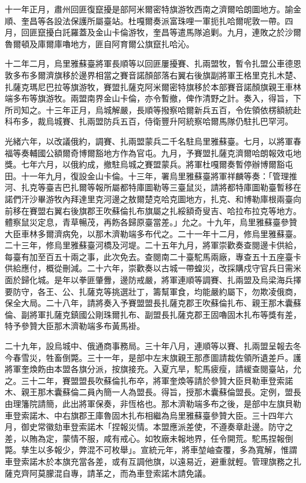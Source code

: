 \begin{pinyinscope}
十一年正月，肅州回匪復竄擾是部阿米爾密特旗游牧西南之濟爾哈朗圖地方。諭金順、奎昌等各設法保護所屬臺站。杜嘎爾奏派富珠哩一軍扼扎哈爾呢敦一帶。四月，回匪竄擾白託羅蓋及金山卡倫游牧，奎昌等遣馬隊追剿。九月，連敗之於沙爾魯爾頓及庫爾庫嚕地方，匪自阿育爾公旗竄扎哈沁。

十二年二月，烏里雅蘇臺將軍長順等以回匪屢擾賽、扎兩盟牧，暫令扎盟公車德恩敦多布多爾濟旗移於邊界相當之賽音諾顏部落右翼右後旗副將軍王格里克扎木楚、扎薩克瑪尼巴拉等旗游牧，賽盟扎薩克阿米爾密特旗移於本部賽音諾顏旗親王車林端多布等旗游牧。兩盟南界金山卡倫，亦令暫撤，俾作清野之計。奏入，得旨，下所司知之。十三年正月，烏城解嚴，長順等撥察哈爾新兵五百，令佐領依楞額統赴科布多，裁烏城賽、扎兩盟防兵五百，侍衛豐升阿統察哈爾馬隊仍駐扎巴罕河。

光緒六年，以改議俄約，調賽、扎兩盟蒙兵二千名駐烏里雅蘇臺。七月，以將軍春福等奏輔國公額爾奇博爾豁地方作為官屯。九月，予賽盟扎薩克濟爾哈朗報效屯地獎。七年六月，以俄約成，撤駐烏城之賽盟蒙兵。將軍杜嘎爾奏暫停辦博爾豁屯田。十一年九月，復設金山卡倫。十三年，署烏里雅蘇臺將軍祥麟等奏：「管理推河、扎克等臺吉巴扎爾等報所屬都特庫圖勒等三臺鼠災，請將都特庫圖勒臺暫移在諾們汗沙畢游牧內拜達里克河邊之敖爾楚克哈克圖地方，扎克、和博勒庫根兩臺向前移在賽盟右翼右後旗郡王吹蘇倫扎布旗屬之扎綏額奇叟吉、哈拉布拉克等地方。體察鼠災定息，青草暢茂，再飭各歸原臺當差。」允之。十九年，烏里雅蘇臺參贊大臣車林多爾濟病免，以那木濟勒端多布代之。二十一年十二月，修烏里雅蘇臺。二十三年，修烏里雅蘇臺河橋及河堤。二十五年九月，將軍崇歡奏查閱邊卡供給，每臺有加至百五十兩之事，此次免去。查閱南二十臺駝馬兩廠，專查五十五座臺卡供給應付，概從刪減。二十六年，崇歡奏以古城一帶蝗災，改採購戍守官兵日需米面於歸化城。是年以拳匪肇釁，邊防戒嚴，將軍連順等調賽、扎兩盟及烏梁海兵擇要防守，各王、公、扎薩克等挑選壯丁，籌幫軍食，均能嚴約屬下，勿欺凌俄商，保全大局。二十八年，請將奏入予賽盟盟長扎薩克郡王吹蘇倫扎布、親王那木囊蘇倫、副將軍扎薩克鎮國公剛珠爾扎布、副盟長扎薩克郡王固嚕固木扎布等獎有差，特予參贊大臣那木濟勒端多布黃馬褂。

二十九年，設烏城中、俄通商事務局。三十年八月，連順等以賽、扎兩盟呈報去冬今春雪災，牲畜倒斃。三十一年，是部中左末旗親王那彥圖請裁佐領所遺差戶。護將軍奎煥飭由本盟各旗分派，按旗接充。入夏亢旱，駝馬疲瘦，請緩查閱臺站，允之。三十二年，賽盟盟長吹蘇倫扎布卒，將軍奎煥等請於參贊大臣貝勒車登索諾木、親王那木囊蘇倫二員內簡一人為盟長。得旨，授那木囊蘇倫盟長。定例，盟長由理籓院請簡，此出將軍保奏，非恆格也。那木濟勒端多布之後，是部中左旗貝勒車登索諾木、中右旗郡王庫魯固木扎布相繼為烏里雅蘇臺參贊大臣。三十四年六月，御史常徽劾車登索諾木「捏報災情。本盟應派差使，不遵奏章赴邊。防守之差，以賄為定，蒙情不服，咸有戒心。如牧廠未報地界，任令開荒。駝馬捏報倒斃。孳生以多報少，弊混不可枚舉」。宣統元年，將車堃岫查覆，多為寬解，惟謂車登索諾木於本旗充當各差，或有互調他旗，以遠易近，避重就輕。管理旗務之扎薩克齊阿莫朦混自專，請革之，而為車登索諾木請免議。


\end{pinyinscope}
